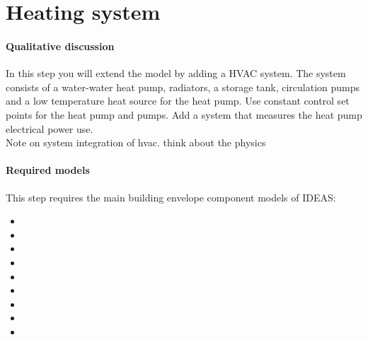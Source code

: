 \documentclass[10pt,a4paper]{article}
\begin{document}
\section{Heating system}
\paragraph{Qualitative discussion}
In this step you will extend the model  
by adding a HVAC system.
The system consists of a water-water heat pump, radiators, 
a storage tank,
circulation pumps and a low temperature heat source for the heat pump.
Use constant control set points for the heat pump and pumps.
Add a system that measures the heat pump electrical power use.\\

Note on system integration of hvac.
think about the physics


\paragraph{Required models}
This step requires the main building envelope component models of IDEAS:
\begin{itemize}
\item {}
\item {}
\item {}
\item {}
\item {}
\item {}
\item {}
\item {}
\item {}
\end{itemize}
\end{document}
